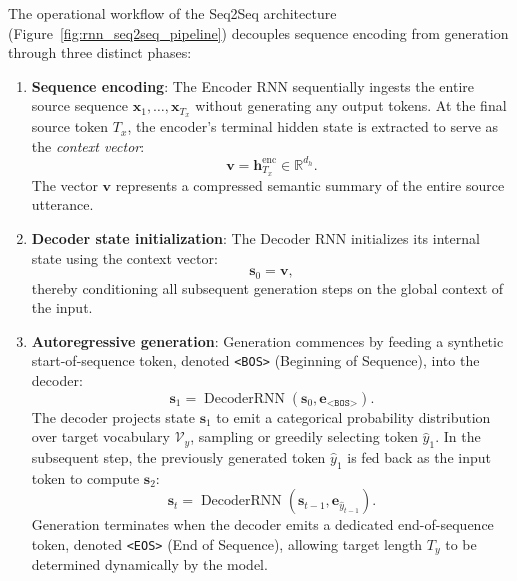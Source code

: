 \documentclass[../../main.tex]{subfiles}
\begin{document}
The operational workflow of the Seq2Seq architecture (Figure~\ref{fig:rnn_seq2seq_pipeline}) decouples sequence encoding from generation through three distinct phases:
\begin{enumerate}
    \item \textbf{Sequence encoding}: The Encoder RNN sequentially ingests the entire source sequence $\mathbf{x}_1, \dots, \mathbf{x}_{T_x}$ without generating any output tokens. At the final source token $T_x$, the encoder's terminal hidden state is extracted to serve as the \textit{context vector}:
    \begin{equation}
    \mathbf{v} = \mathbf{h}_{T_x}^{\text{enc}} \in \mathbb{R}^{d_h}.
    \label{eq:context_vector}
    \end{equation}
    The vector $\mathbf{v}$ represents a compressed semantic summary of the entire source utterance.
    
    \item \textbf{Decoder state initialization}: The Decoder RNN initializes its internal state using the context vector:
    \begin{equation}
    \mathbf{s}_0 = \mathbf{v},
    \end{equation}
    thereby conditioning all subsequent generation steps on the global context of the input.
    
    \item \textbf{Autoregressive generation}: Generation commences by feeding a synthetic start-of-sequence token, denoted \texttt{<BOS>} (Beginning of Sequence), into the decoder:
    \begin{equation}
    \mathbf{s}_1 = \operatorname{DecoderRNN}\left(\mathbf{s}_0, \mathbf{e}_{\texttt{<BOS>}}\right).
    \end{equation}
    The decoder projects state $\mathbf{s}_1$ to emit a categorical probability distribution over target vocabulary $\mathcal{V}_y$, sampling or greedily selecting token $\hat{y}_1$. In the subsequent step, the previously generated token $\hat{y}_1$ is fed back as the input token to compute $\mathbf{s}_2$:
    \begin{equation}
    \mathbf{s}_t = \operatorname{DecoderRNN}\left(\mathbf{s}_{t-1}, \mathbf{e}_{\hat{y}_{t-1}}\right).
    \label{eq:decoder_autoregression}
    \end{equation}
    Generation terminates when the decoder emits a dedicated end-of-sequence token, denoted \texttt{<EOS>} (End of Sequence), allowing target length $T_y$ to be determined dynamically by the model.
\end{enumerate}
\end{document}
